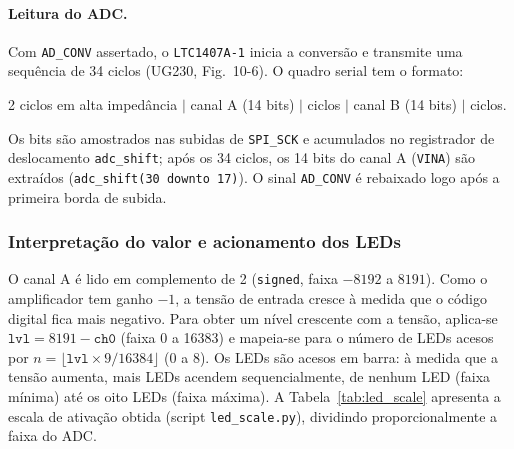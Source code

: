 \documentclass[12pt,a4paper]{article}
\begin{document}
\paragraph{Leitura do ADC.}
Com \texttt{AD\_CONV} assertado, o \texttt{LTC1407A-1} inicia a conversão e transmite uma
sequência de 34 ciclos (UG230, Fig.~10-6). O quadro serial tem o formato:
\begin{center}
    2 ciclos em alta impedância \;$|$\; canal A (14 bits) \;$|$ ciclos \;$|$\;
    canal B (14 bits) \;$|$ ciclos.
\end{center}
Os bits são amostrados nas subidas de \texttt{SPI\_SCK} e acumulados no registrador de
deslocamento \texttt{adc\_shift}; após os 34 ciclos, os 14 bits do canal A
(\texttt{VINA}) são extraídos (\texttt{adc\_shift(30 downto 17)}). O sinal \texttt{AD\_CONV}
é rebaixado logo após a primeira borda de subida.

\subsubsection{Interpretação do valor e acionamento dos LEDs}

O canal A é lido em complemento de 2 (\texttt{signed}, faixa $-8192$ a $8191$). Como o
amplificador tem ganho $-1$, a tensão de entrada cresce à medida que o código digital fica
mais negativo. Para obter um nível crescente com a tensão, aplica-se
$\texttt{lvl} = 8191 - \texttt{ch0}$ (faixa 0 a 16383) e mapeia-se para o número de LEDs
acesos por $n = \lfloor \texttt{lvl} \times 9 / 16384 \rfloor$ (0 a 8). Os LEDs são acesos
em barra: à medida que a tensão aumenta, mais LEDs acendem sequencialmente, de nenhum LED
(faixa mínima) até os oito LEDs (faixa máxima). A Tabela~\ref{tab:led_scale} apresenta a
escala de ativação obtida (script \texttt{led\_scale.py}), dividindo proporcionalmente a
faixa do ADC.
\end{document}
